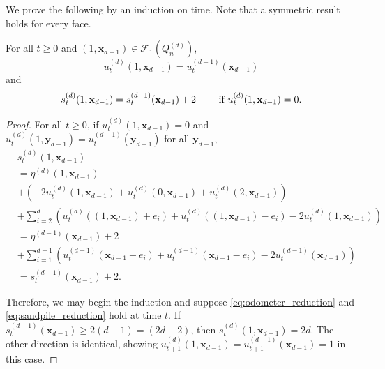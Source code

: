 \documentclass[12pt]{amsart}
\begin{document}
We prove the following by an induction on time. Note that a symmetric result holds for every face. 
\begin{prop} \label{prop:dimensional_reduction}
	For all $t \geq 0$ and $(1, \mathbf{x}_{d-1}) \in \mathcal{F}_1(Q_n^{(d)})$, 
	\begin{equation} \label{eq:odometer_reduction}
	u_t^{(d)}(1,\mathbf{x}_{d-1}) = u_t^{(d-1)}(\mathbf{x}_{d-1})
	\end{equation}
	and
	\begin{equation} \label{eq:sandpile_reduction}
	s_t^{(d)}(1,\mathbf{x}_{d-1}) = s_t^{(d-1)}(\mathbf{x}_{d-1}) + 2 \qquad \mbox{ if $ u_t^{(d)}(1,\mathbf{x}_{d-1}) = 0 $}.
	\end{equation}
\end{prop}

\begin{proof}
	For all $t \geq 0$, if  $u_{t}^{(d)}(1,\mathbf{x}_{d-1}) = 0$ and $u_t^{(d)}(1,\mathbf{y}_{d-1}) = u_t^{(d-1)}(\mathbf{y}_{d-1})$ for all $\mathbf{y}_{d-1}$, 
	\begin{align*}
	&s_{t}^{(d)}(1, \mathbf{x}_{d-1}) \\
	&=  \eta^{(d)}(1, \mathbf{x}_{d-1})  \\
	&+ \left( -2 u_{t}^{(d)}(1, \mathbf{x}_{d-1}) + u_{t}^{(d)}(0, \mathbf{x}_{d-1}) + u_{t}^{(d)}(2, \mathbf{x}_{d-1}) \right) \\
	&+ \sum_{i=2}^d \left( u_{t}^{(d)}((1,\mathbf{x}_{d-1}) + e_i) + u_{t}^{(d)}((1,\mathbf{x}_{d-1})-e_i) - 2 u_{t}^{(d)}(1,\mathbf{x}_{d-1}) \right) \\
	&= \eta^{(d-1)}(\mathbf{x}_{d-1}) + 2 \\
	&+  \sum_{i=1}^{d-1} \left( u_{t}^{(d-1)}(\mathbf{x}_{d-1} + e_i) + u_{t}^{(d-1)}(\mathbf{x}_{d-1}-e_i) - 2 u_{t}^{(d-1)}(\mathbf{x}_{d-1}) \right) \\
	&=s_{t}^{(d-1)}(\mathbf{x}_{d-1})+2.
	\end{align*}
	
	Therefore, we may begin the induction and suppose \eqref{eq:odometer_reduction} and \eqref{eq:sandpile_reduction} hold at time $t$.
	If $s_t^{(d-1)}(\mathbf{x}_{d-1}) \geq 2  (d - 1) = (2 d - 2)$, then 
	$s_t^{(d)}(1,\mathbf{x}_{d-1}) = 2 d$. The other direction is identical, showing $u_{t+1}^{(d)}(1, \mathbf{x}_{d-1}) = u_{t+1}^{(d-1)}(\mathbf{x}_{d-1}) = 1$ in this case. 
	
\end{proof}
\end{document}
